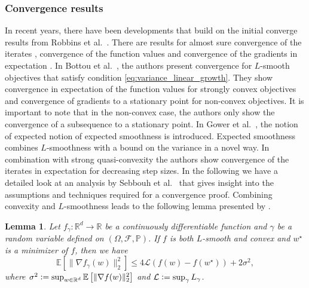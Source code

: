 \documentclass[12pt]{article}
\newtheorem{lemma}[theorem]{Lemma}
\theoremstyle{definition}
\numberwithin{equation}{section}
\newcommand{\R}{\mathbb{R}}
\newcommand{\BP}{\mathbb{P}}
\newcommand{\CF}{\mathcal{F}}
\newcommand{\CL}{\mathcal{L}}
\newcommand{\ev}[1]{\mathbb{E}\left[{#1}\right]}
\newcommand{\norm}[1]{\lVert{#1}\rVert_2}
\newcommand{\defeq}{\vcentcolon=}
\begin{document}
\subsubsection{Convergence results}
In recent years, there have been developments that build on the initial converge results from Robbins et al.\ \autocite{robbinsStochasticApproximationMethod1951}. There are results for almost sure convergence of the iterates \autocite{zhouStochasticMirrorDescent2017, nguyenSGDHogwildConvergence2018, sebbouhAlmostSureConvergence2021}, convergence of the function values and convergence of the gradients in expectation \autocite{bottouOptimizationMethodsLargeScale2018}.  
In Bottou et al.\ \autocite{bottouOptimizationMethodsLargeScale2018}, the authors present convergence for $L$-smooth objectives that satisfy condition \ref{eq:variance_linear_growth}. They show convergence in expectation of the function values for strongly convex objectives and convergence of gradients to a stationary point for non-convex objectives. It is important to note that in the non-convex case, the authors only show the convergence of a subsequence to a stationary point. In Gower et al.\ \autocite{gowerSGDGeneralAnalysis2019}, the notion of expected notion of expected smoothness is introduced. Expected smoothness combines $L$-smoothness with a bound on the variance in a novel way. In combination with strong quasi-convexity the authors show convergence of the iterates in expectation for decreasing step sizes.
In the following we have a detailed look at an analysis by Sebbouh et al.\ \autocite{sebbouhAlmostSureConvergence2021} that gives insight into the assumptions and techniques required for a convergence proof.
Combining convexity and $L$-smoothness leads to the following lemma presented by \autocite{sebbouhAlmostSureConvergence2021}.
\begin{lemma}
  \label{lemma:gradient_inequality}
  Let $f_{\gamma} : \R^d \rightarrow \R$ be a continuously differentiable function and $\gamma$ be a random variable defined on $(\Omega, \CF, \BP)$. If $f$ is both $L$-smooth and convex and $w^\star$ is a minimizer of $f$, then we have
  \begin{equation}
    \ev{\norm{\nabla f_{\gamma}(w)}^2} \leq 4 \CL (f(w) - f(w^\star)) + 2 \sigma^2,
  \end{equation}
  where $\sigma^2 \defeq \sup_{w \in \R^d} \ev{\norm{\nabla f(w)}^2}$ and $\CL \defeq \sup_{\gamma} L_{\gamma}$.
\end{lemma}
\end{document}
